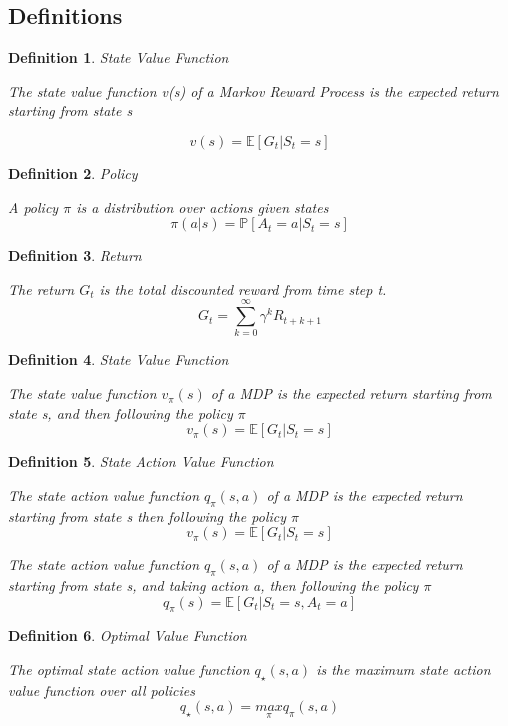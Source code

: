 \documentclass[12pt,a4paper]{article}
\newtheorem{definition}{Definition}
\begin{document}
\subsection{Definitions}

\begin{definition}{State Value Function}

The state value function v(s) of a Markov Reward Process is the expected return starting from state s

\[ 
v(s) = \mathbb{E}[G_{t} \vert S_{t}=s]
\]
\end{definition}

\begin{definition}{Policy}

A policy $\pi$ is a distribution over actions given states
\[ 
\pi(a\vert s) = \mathbb{P}[A_{t}=a \vert S_{t}=s]
\]
\end{definition}

\begin{definition}{Return}

The return $G_{t}$ is the total discounted reward from time step t.
\[ 
G_{t} = \sum_{k=0}^{\infty}{\gamma^{k}R_{t+k+1}}
\]
\end{definition}

\begin{definition}{State Value Function}

The state value function $v_{\pi}(s)$ of a MDP is the expected return starting from state s, and then following the policy $\pi$
\[ 
v_{\pi}(s) = \mathbb{E}[G_{t} \vert S_{t}=s]
\]
\end{definition}

\begin{definition}{State Action Value Function}

The state action value function $q_{\pi}(s, a)$ of a MDP is the expected return starting from state s then following the policy $\pi$
\[ 
v_{\pi}(s) = \mathbb{E}[G_{t} \vert S_{t}=s]
\]

The state action value function $q_{\pi}(s, a)$ of a MDP is the expected return starting from state s, and taking action a, then following the policy $\pi$
\[ 
q_{\pi}(s) = \mathbb{E}[G_{t} \vert S_{t}=s, A_{t}=a]
\]

\end{definition}

\begin{definition}{Optimal Value Function}

The optimal state action value function $q_{\star}(s, a)$ is the maximum state action value function over all policies
\[ 
q_{\star}(s, a) = \underset{\pi}{max}{q_{\pi}(s, a)}
\]
\end{definition}
\end{document}
